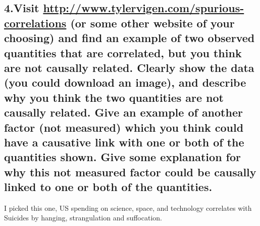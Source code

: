 \documentclass[
]{article}
\begin{document}
\hypertarget{visit-httpwww.tylervigen.comspurious-correlations-or-some-other-website-of-your-choosing-and-find-an-example-of-two-observed-quantities-that-are-correlated-but-you-think-are-not-causally-related.-clearly-show-the-data-you-could-download-an-image-and-describe-why-you-think-the-two-quantities-are-not-causally-related.-give-an-example-of-another-factor-not-measured-which-you-think-could-have-a-causative-link-with-one-or-both-of-the-quantities-shown.-give-some-explanation-for-why-this-not-measured-factor-could-be-causally-linked-to-one-or-both-of-the-quantities.}{%
\subsection{\texorpdfstring{4.Visit
\url{http://www.tylervigen.com/spurious-correlations} (or some other
website of your choosing) and find an example of two observed quantities
that are correlated, but you think are not causally related. Clearly
show the data (you could download an image), and describe why you think
the two quantities are not causally related. Give an example of another
factor (not measured) which you think could have a causative link with
one or both of the quantities shown. Give some explanation for why this
not measured factor could be causally linked to one or both of the
quantities.}{4.Visit http://www.tylervigen.com/spurious-correlations (or some other website of your choosing) and find an example of two observed quantities that are correlated, but you think are not causally related. Clearly show the data (you could download an image), and describe why you think the two quantities are not causally related. Give an example of another factor (not measured) which you think could have a causative link with one or both of the quantities shown. Give some explanation for why this not measured factor could be causally linked to one or both of the quantities.}}\label{visit-httpwww.tylervigen.comspurious-correlations-or-some-other-website-of-your-choosing-and-find-an-example-of-two-observed-quantities-that-are-correlated-but-you-think-are-not-causally-related.-clearly-show-the-data-you-could-download-an-image-and-describe-why-you-think-the-two-quantities-are-not-causally-related.-give-an-example-of-another-factor-not-measured-which-you-think-could-have-a-causative-link-with-one-or-both-of-the-quantities-shown.-give-some-explanation-for-why-this-not-measured-factor-could-be-causally-linked-to-one-or-both-of-the-quantities.}}

I picked this one, US spending on science, space, and technology
correlates with Suicides by hanging, strangulation and suffocation.
\end{document}
